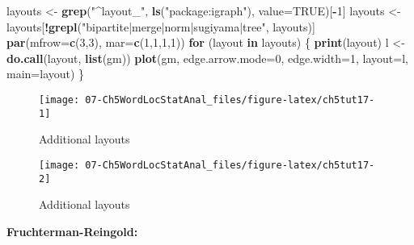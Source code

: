 \documentclass[
]{article}
\newenvironment{Shaded}{\begin{snugshade}}{\end{snugshade}}
\newcommand{\AttributeTok}[1]{\textcolor[rgb]{0.13,0.29,0.53}{#1}}
\newcommand{\ConstantTok}[1]{\textcolor[rgb]{0.56,0.35,0.01}{#1}}
\newcommand{\ControlFlowTok}[1]{\textcolor[rgb]{0.13,0.29,0.53}{\textbf{#1}}}
\newcommand{\DecValTok}[1]{\textcolor[rgb]{0.00,0.00,0.81}{#1}}
\newcommand{\FunctionTok}[1]{\textcolor[rgb]{0.13,0.29,0.53}{\textbf{#1}}}
\newcommand{\NormalTok}[1]{#1}
\newcommand{\OtherTok}[1]{\textcolor[rgb]{0.56,0.35,0.01}{#1}}
\newcommand{\SpecialCharTok}[1]{\textcolor[rgb]{0.81,0.36,0.00}{\textbf{#1}}}
\newcommand{\StringTok}[1]{\textcolor[rgb]{0.31,0.60,0.02}{#1}}
\begin{document}
\begin{Shaded}
\begin{Highlighting}[]
\NormalTok{layouts }\OtherTok{\textless{}{-}} \FunctionTok{grep}\NormalTok{(}\StringTok{"\^{}layout\_"}\NormalTok{, }\FunctionTok{ls}\NormalTok{(}\StringTok{"package:igraph"}\NormalTok{), }
                \AttributeTok{value=}\ConstantTok{TRUE}\NormalTok{)[}\SpecialCharTok{{-}}\DecValTok{1}\NormalTok{]}
\NormalTok{layouts }\OtherTok{\textless{}{-}}\NormalTok{ layouts[}\SpecialCharTok{!}\FunctionTok{grepl}\NormalTok{(}\StringTok{"bipartite|merge|norm|sugiyama|tree"}\NormalTok{,}
\NormalTok{                          layouts)]}
\FunctionTok{par}\NormalTok{(}\AttributeTok{mfrow=}\FunctionTok{c}\NormalTok{(}\DecValTok{3}\NormalTok{,}\DecValTok{3}\NormalTok{), }\AttributeTok{mar=}\FunctionTok{c}\NormalTok{(}\DecValTok{1}\NormalTok{,}\DecValTok{1}\NormalTok{,}\DecValTok{1}\NormalTok{,}\DecValTok{1}\NormalTok{))}
\ControlFlowTok{for}\NormalTok{ (layout }\ControlFlowTok{in}\NormalTok{ layouts) \{}
      \FunctionTok{print}\NormalTok{(layout)}
\NormalTok{      l }\OtherTok{\textless{}{-}} \FunctionTok{do.call}\NormalTok{(layout, }\FunctionTok{list}\NormalTok{(gm)) }
      \FunctionTok{plot}\NormalTok{(gm, }\AttributeTok{edge.arrow.mode=}\DecValTok{0}\NormalTok{, }\AttributeTok{edge.width=}\DecValTok{1}\NormalTok{, }\AttributeTok{layout=}\NormalTok{l, }
           \AttributeTok{main=}\NormalTok{layout) \}}
\end{Highlighting}
\end{Shaded}

\begin{figure}

{\centering \texttt{[image: 07-Ch5WordLocStatAnal\_files/figure-latex/ch5tut17-1]} 

}

\caption{Additional layouts}\label{fig:ch5tut17-1}
\end{figure}
\begin{figure}

{\centering \texttt{[image: 07-Ch5WordLocStatAnal\_files/figure-latex/ch5tut17-2]} 

}

\caption{Additional layouts}\label{fig:ch5tut17-2}
\end{figure}

\textbf{Fruchterman-Reingold:}
\end{document}
